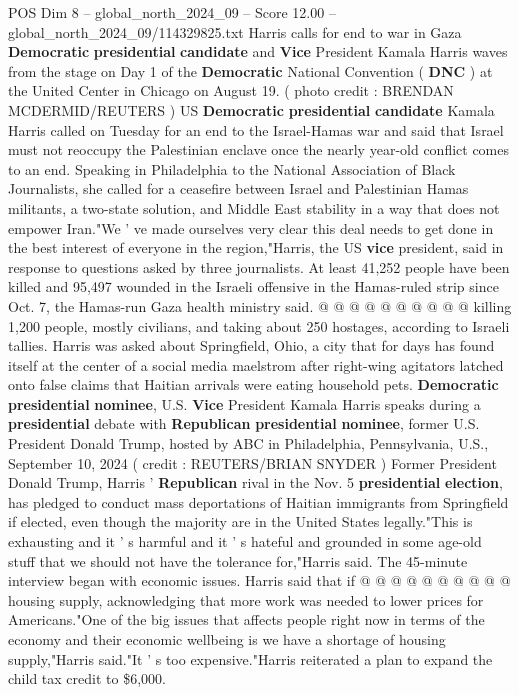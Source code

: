\begin{textsample}{POS Dim 8 – global\_north\_2024\_09 – Score 12.00 – global\_north\_2024\_09/114329825.txt}  \label{ex:f8_pos_090}
Harris calls for end to war in Gaza \textbf{Democratic} \textbf{presidential} \textbf{candidate} and \textbf{Vice} President Kamala Harris waves from the stage on Day 1 of the \textbf{Democratic} National Convention ( \textbf{DNC} ) at the United Center in Chicago on August 19. ( photo credit : BRENDAN MCDERMID/REUTERS ) US \textbf{Democratic} \textbf{presidential} \textbf{candidate} Kamala Harris called on Tuesday for an end to the Israel-Hamas war and said that Israel must not reoccupy the Palestinian enclave once the nearly year-old conflict comes to an end.
Speaking in Philadelphia to the National Association of Black Journalists, she called for a ceasefire between Israel and Palestinian Hamas militants, a two-state solution, and Middle East stability in a way that does not empower Iran."We ' ve made ourselves very clear this deal needs to get done in the best interest of everyone in the region,"Harris, the US \textbf{vice} president, said in response to questions asked by three journalists.
At least 41,252 people have been killed and 95,497 wounded in the Israeli offensive in the Hamas-ruled strip since Oct. 7, the Hamas-run Gaza health ministry said. @ @ @ @ @ @ @ @ @ @ killing 1,200 people, mostly civilians, and taking about 250 hostages, according to Israeli tallies.
Harris was asked about Springfield, Ohio, a city that for days has found itself at the center of a social media maelstrom after right-wing agitators latched onto false claims that Haitian arrivals were eating household pets. \textbf{Democratic} \textbf{presidential} \textbf{nominee}, U.S. \textbf{Vice} President Kamala Harris speaks during a \textbf{presidential} debate with \textbf{Republican} \textbf{presidential} \textbf{nominee}, former U.S.
President Donald Trump, hosted by ABC in Philadelphia, Pennsylvania, U.S., September 10, 2024 ( credit : REUTERS/BRIAN SNYDER ) Former President Donald Trump, Harris ' \textbf{Republican} rival in the Nov. 5 \textbf{presidential} \textbf{election}, has pledged to conduct mass deportations of Haitian immigrants from Springfield if elected, even though the majority are in the United States legally."This is exhausting and it ' s harmful and it ' s hateful and grounded in some age-old stuff that we should not have the tolerance for,"Harris said.
The 45-minute interview began with economic issues.
Harris said that if @ @ @ @ @ @ @ @ @ @ housing supply, acknowledging that more work was needed to lower prices for Americans."One of the big issues that affects people right now in terms of the economy and their economic wellbeing is we have a shortage of housing supply,"Harris said."It ' s too expensive."Harris reiterated a plan to expand the child tax credit to \$6,000.

\end{textsample}
